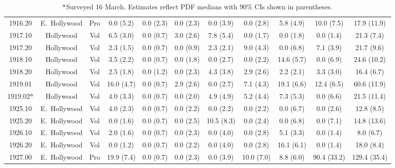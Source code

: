 \documentclass[11pt,twocolumn]{article}
\begin{document}
\begin{table}[t]
{\begin{tabular}{ccccccccccc}
1916.20 & E.~Hollywood & Pro &  0.0 (5.2) &  0.0 (2.3) &  0.0 (2.3) &  0.0 (3.9) &  0.0 (2.8) &  5.8 (4.9) & 10.0 (7.5) &  17.9 (11.9) \\
1917.10 & Hollywood & Vol &  6.5 (3.0) &  0.0 (0.7) &  3.0 (2.6) &  7.8 (5.4) &  0.0 (1.7) &  0.0 (1.8) &  0.0 (1.4) &  21.3 (7.4) \\
1917.20 & Hollywood & Vol &  2.3 (1.5) &  0.0 (0.7) &  0.0 (0.9) &  2.3 (2.1) &  9.0 (4.3) &  0.0 (6.8) &  7.1 (3.9) &  21.7 (9.6) \\
1918.10 & Hollywood & Vol &  3.5 (2.2) &  0.0 (0.7) &  0.0 (1.8) &  0.0 (2.7) &  0.0 (2.2) & 14.6 (5.7) &  0.0 (6.9) &  24.6 (10.2) \\
1918.20 & Hollywood & Vol &  2.5 (1.8) &  0.0 (1.2) &  0.0 (2.3) &  4.3 (3.8) &  2.9 (2.6) &  2.2 (2.1) &  3.3 (3.0) &  16.4 (6.7) \\
1919.01 & Hollywood & Vol & 16.0 (4.7) &  0.0 (0.7) &  2.9 (2.6) &  0.0 (2.7) &  7.1 (4.3) & 19.1 (6.6) & 12.4 (6.5) &  60.6 (11.9) \\
1919.02$^{\rm a}$ & Hollywood & Vol &  4.0 (3.3) &  0.0 (0.7) &  0.0 (2.0) &  4.9 (4.9) &  5.2 (4.4) &  7.3 (5.3) &  0.0 (6.6) &  21.5 (11.4) \\
1925.10 & E.~Hollywood & Vol &  4.0 (2.3) &  0.0 (0.7) &  0.0 (2.2) &  0.0 (2.2) &  0.0 (2.2) &  0.0 (6.7) &  0.0 (2.6) &  12.8 (8.5) \\
1925.20 & E.~Hollywood & Vol &  0.0 (1.6) &  0.0 (0.7) &  0.0 (2.5) & 10.5 (8.3) &  0.0 (2.4) &  0.0 (6.8) &  0.0 (7.1) &  14.8 (13.6) \\
1926.10 & E.~Hollywood & Vol &  2.0 (1.6) &  0.0 (0.7) &  0.0 (2.3) &  0.0 (4.0) &  0.0 (2.8) &  5.1 (3.3) &  0.0 (1.4) &   8.0 (6.7) \\
1926.20 & E.~Hollywood & Vol &  0.0 (1.2) &  0.0 (0.7) &  0.0 (2.2) &  0.0 (4.0) &  0.0 (2.8) & 16.1 (6.1) &  0.0 (1.4) &  18.0 (8.4) \\
1927.00 & E.~Hollywood & Pro & 19.9 (7.4) &  0.0 (0.7) &  0.0 (2.3) &  0.0 (3.9) & 10.0 (7.0) &  8.8 (6.0) & 90.4 (33.2) & 129.4 (35.4) \\
\bottomrule
\end{tabular}
}
\caption*{$^{\rm a}$Surveyed 16 March. Estimates reflect PDF medians with 90\% CIs shown in parentheses.}
\label{tbl:allPop}
\end{table}
\end{document}

